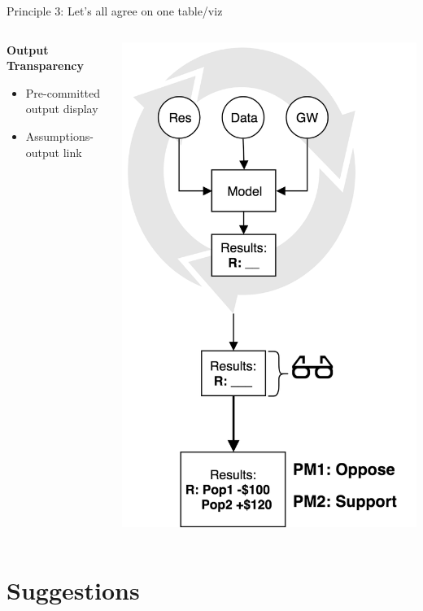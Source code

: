 \documentclass{beamer}
\begin{document}
\begin{frame}{Principle 3: Let's all agree on one table/viz}
\begin{columns}
\begin{column}{0.3\textwidth}
 \textbf{Output \\ Transparency}
   \begin{itemize}
   \item Pre-committed output display
   \item Assumptions- output link
   \end{itemize}
\end{column}
\begin{column}{0.7\textwidth}  %
    \begin{center}
    \vspace{-0.8em}
     \includegraphics[width=.6\textwidth]{../Images/o_transp.png}
     \end{center}
\end{column}
\end{columns}
\end{frame}


\section{Suggestions}
\end{document}
